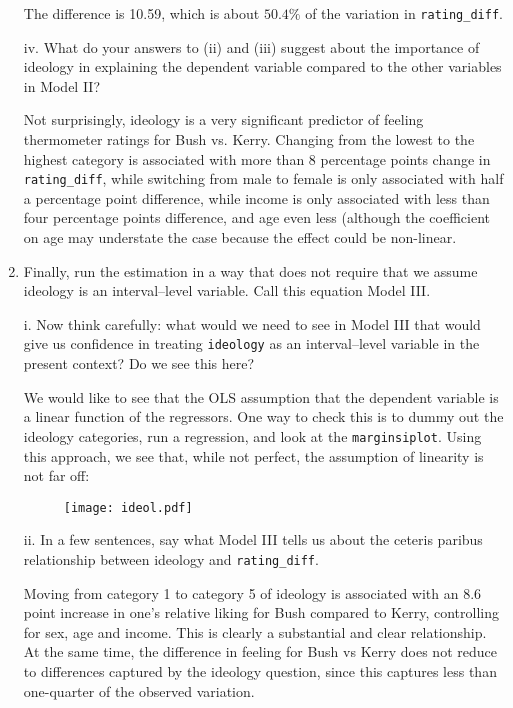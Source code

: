 \documentclass[12pt]{article}
\begin{document}
\begin{enumerate}
\vspace{4mm}

The difference is 10.59, which is about $50.4\%$ of the variation in \verb|rating_diff|.

\vspace{4mm}

iv. What do your answers to (ii) and (iii) suggest about the importance of ideology in explaining the dependent variable compared to the other variables in Model II?
\vspace{4mm}

Not surprisingly, ideology is a very significant predictor of feeling thermometer ratings for Bush vs. Kerry. Changing from the lowest to the highest category is associated with more than 8 percentage points change in \verb|rating_diff|, while switching from male to female is only associated with half a percentage point difference, while income is only associated with less than four percentage points difference, and age even less (although the coefficient on age may understate the case because the effect could be non-linear.

\item Finally, run the estimation in a way that does not require that we assume ideology is an interval--level variable. Call this equation Model III.\
\vspace{4mm}

i. Now think carefully: what would we need to see in Model III that would give us confidence in treating \verb|ideology| as an interval--level variable in the present context? Do we see this here?
\vspace{4mm}

We would like to see that the OLS assumption that the dependent variable is a linear function of the regressors.  One way to check this is to dummy out the ideology categories, run a regression, and look at the \verb|marginsiplot|. Using this approach, we see that, while not perfect, the assumption of linearity is not far off:

\begin{figure}[H]%
	\begin{center} %
	\texttt{[image: ideol.pdf]}
	\end{center} 
	\end{figure}

\vspace{4mm}
ii. In a few sentences, say what Model III tells us about the ceteris paribus relationship between ideology and \verb|rating_diff|.
\vspace{4mm}

Moving from category 1 to category 5 of ideology is associated with an 8.6 point increase in one's relative liking for Bush compared to Kerry, controlling for sex, age and income. This is clearly a substantial and clear relationship. At the same time, the difference in feeling for Bush vs Kerry does not reduce to differences captured by the ideology question, since this captures less than one-quarter of the observed variation.

\end{enumerate}
\end{document}
